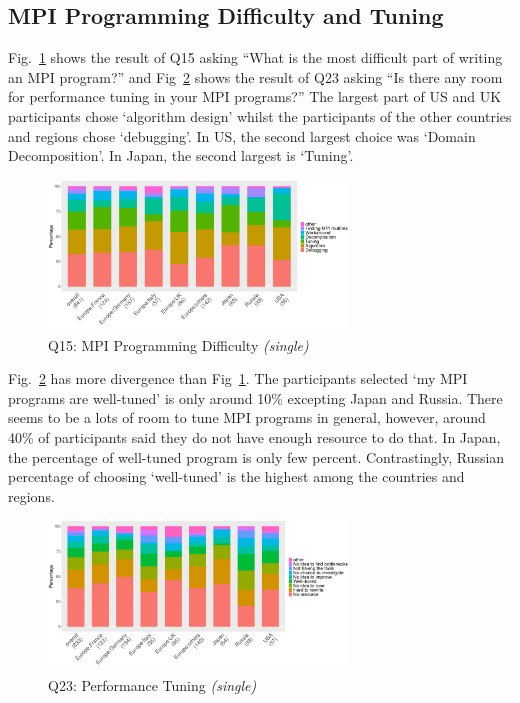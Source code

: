 \documentclass[conference,10pt,letterpaper]{IEEEtran}
\def\myquote#1{`#1'}
\begin{document}
\subsection{MPI Programming Difficulty and Tuning}

Fig.~\ref{fig:difficulty} shows the result of Q15 asking ``What is the
most difficult part of writing an MPI program?'' and
Fig~\ref{fig:tuning} shows the result of Q23 asking ``Is there any
room for performance tuning in your MPI programs?'' The largest part
of US and UK participants chose \myquote{algorithm design} whilst the
participants of the other countries and regions chose
\myquote{debugging}. In US, the second largest choice was
\myquote{Domain Decomposition}. In Japan, the second largest is
\myquote{Tuning}. 

\begin{figure}[htb]
\begin{center}
\includegraphics[width=8cm]{R-scripts/Q15.pdf}
\caption{Q15: MPI Programming Difficulty {\it(single)}}
\label{fig:difficulty}
\end{center}
\end{figure}

Fig.~\ref{fig:tuning} has more divergence than
Fig~\ref{fig:difficulty}. The participants selected \myquote{my MPI
  programs are well-tuned} is only around 10\% excepting Japan and
Russia. There seems to be a lots of room to tune MPI programs in
general, however, around 40\% of participants said they do not have
enough resource to do that. In Japan, the percentage of well-tuned
program is only few percent. Contrastingly, Russian percentage of
choosing \myquote{well-tuned} is the highest among the countries and
regions. 

\begin{figure}[htb]
\begin{center}
\includegraphics[width=8cm]{R-scripts/Q23.pdf}
\caption{Q23: Performance Tuning {\it(single)}}
\label{fig:tuning}
\end{center}
\end{figure}
\end{document}
